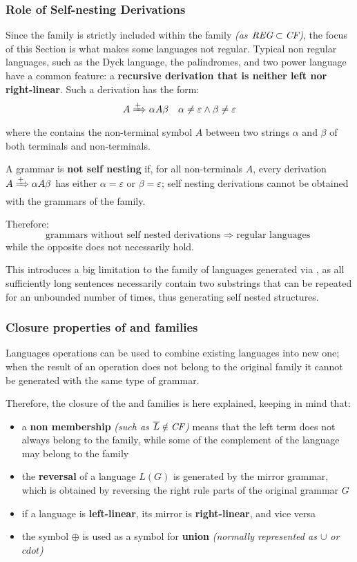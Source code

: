 \documentclass[english]{article}
\begin{document}
\subsubsection{Role of Self-nesting Derivations}

Since the \REG family is strictly included within the \CF family \textit{(as \(\textit{REG} \subset \textit{CF}\))}, the focus of this Section is what makes some languages not regular.
Typical non regular languages, such as the Dyck language, the palindromes, and two power language have a common feature:
a \textbf{recursive derivation that is neither left nor right-linear}.
Such a derivation has the form:
\[ A \xRightarrow{+} \alpha A \beta \quad \alpha \neq \varepsilon \land \beta \neq \varepsilon \]
where the \RP contains the non-terminal symbol \(A\) between two strings \(\alpha\) and \(\beta\) of both terminals and non-terminals.

\bigskip
A grammar is \textbf{not self nesting} if, for all non-terminals \(A\), every derivation \(A \xRightarrow{+} \alpha A \beta\) has either \(\alpha = \varepsilon\) or \(\beta = \varepsilon\);
self nesting derivations cannot be obtained with the grammars of the \REG family.

Therefore:
\[ \text{grammars without self nested derivations } \Rightarrow \text{ regular languages } \]
while the opposite does not necessarily hold.

\bigskip
This introduces a big limitation to the family of languages generated via \re, as all sufficiently long sentences necessarily contain two substrings that can be repeated for an unbounded number of times, thus generating self nested structures.

\subsubsection{Closure properties of \REG and \CF families}
\label{sec:closure-properties-reg-and-cf}

Languages operations can be used to combine existing languages into new one;
when the result of an operation does not belong to the original family it cannot be generated with the same type of grammar.

Therefore, the closure of the \REG and \CF families is here explained, keeping in mind that:

\begin{itemize}
  \item a \textbf{non membership} \textit{(such as \(\overline{L} \notin \textit{CF}\))} means that the left term does not always belong to the family, while some of the complement of the language may belong to the family
  \item the \textbf{reversal} of a language \(L(G)\) is generated by the mirror grammar, which is obtained by reversing the right rule parts of the original grammar \(G\)
  \item if a language is \textbf{left-linear}, its mirror is \textbf{right-linear}, and vice versa
  \item the symbol \(\oplus\) is used as a symbol for \textbf{union} \textit{(normally represented as \(\cup\) or \(cdot\))}
\end{itemize}
\end{document}

